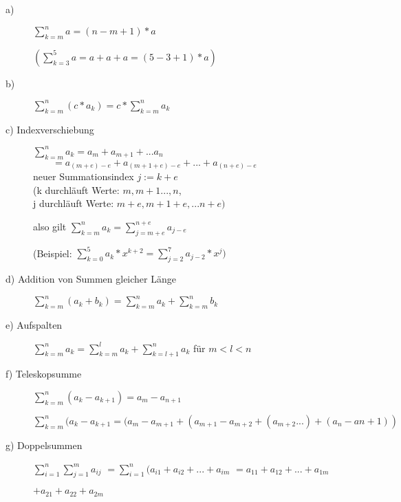 \documentclass[a4paper, 12pt, twoside] {article}
\begin{document}
\begin{description}
	\item[a)] \hfill

	$\sum_{k=m}^{n} a = (n - m+ 1) * a$

	$(\sum_{k=3}^{5} a = a + a + a = (5-3+1)*a)$

	\item[b)] \hfill

	$\sum_{k=m}^{n} (c * a_k) = c * \sum_{k=m}^{n} a_k$

	\item[c) Indexverschiebung] \hfill

	$\sum_{k=m}^{n} a_k = a_m + a_{m+1} + ... a_n$ \\
	$\qquad = a_{(m + e) - e} + a_{(m+1+e)-e} + ... + a_{(n+e)-e}$ \\
	neuer Summationsindex $j := k +e$ \\
	(k durchläuft Werte: $m, m+1 ..., n$, \\
	j durchläuft Werte: $m + e, m+1+e, ... n+e)$

	also gilt
	$\sum_{k=m}^{n} a_k = \sum_{j = m+e}^{n+e} a_{j-e}$

	(Beispiel:
	$\sum_{k=0}^{5} a_k * x^{k+2} = \sum_{j = 2}^{7} a_{j-2} * x^j)$

	\item[d) Addition von Summen gleicher Länge] \hfill

	$\sum_{k=m}^{n} (a_k + b_k) = \sum_{k=m}^{n} a_k + \sum_{k=m}^{n} b_k$

	\item[e) Aufspalten] \hfill

	$\sum_{k=m}^{n} a_k = \sum_{k=m}^{l} a_k + \sum_{k=l+1}^{n} a_k$ für  $m < l < n$

	\item[f) Teleskopsumme] \hfill

	$\sum_{k=m}^{n} (a_k - a_{k+1}) = a_m - a_{n+1}$

	$\sum_{k=m}^{n} (a_k - a_{k+1} = (a_m - a_{m+1} + (a_{m+1} - a_{m+2} + (a_{m+2} ... ) + (a_n - a{n+1}))$ %

	\item[g) Doppelsummen] \hfill

	$\sum_{i=1}^{n} \sum_{j=1}^{m} a_{ij}$
	$= \sum_{i=1}^{n} (a_{i1} + a_{i2} + ... + a_{im}$
	$= a_{11} + a_{12} + ... + a_{1m}$

	$+ a_{21} + a_{22} + a_{2m}$

\end{description}
\end{document}

